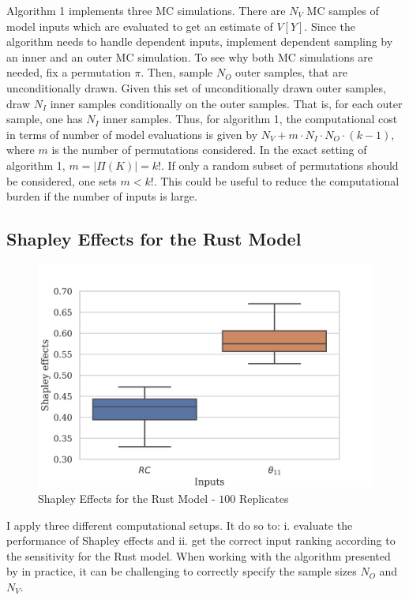Algorithm 1 implements three MC simulations. There are $N_V$ MC samples of model inputs which are evaluated to get an estimate of $V[Y]$. Since the algorithm needs to handle dependent inputs, \citet{SNS16} implement dependent sampling by an inner and an outer MC simulation. To see why both MC simulations are needed, fix a permutation $\pi$. Then, sample $N_O$ outer samples, that are unconditionally drawn. Given this set of unconditionally drawn outer samples, draw $N_I$ inner samples conditionally on the outer samples. That is, for each outer sample, one has $N_I$ inner samples. Thus, for algorithm 1, the computational cost in terms of number of model evaluations is given by $N_V+m \cdot N_I \cdot N_O \cdot (k-1)$, where $m$ is the number of permutations considered. In the exact setting of algorithm 1, $m=\vert \Pi(K) \vert=k!$. If only a random subset of permutations should be considered, one sets $m<k!$. This could be useful to reduce the computational burden if the number of inputs is large.

\subsection{Shapley Effects for the Rust Model} \label{shapley_rust_model}

\begin{figure}[t]
	\caption{Shapley Effects for the Rust Model - $100$ Replicates}
    \label{boxplot_shapley}
	\vspace*{-4mm}
	\centering
	\includegraphics[scale=0.9]{../figures/boxplot_shapley_effects_100.png}
\end{figure}

I apply three different computational setups. It do so to: i. evaluate the performance of Shapley effects and ii. get the correct input ranking according to the sensitivity for the Rust model. When working with the algorithm presented by \citet{SNS16} in practice, it can be challenging to correctly specify the sample sizes $N_O$ and $N_V$.


